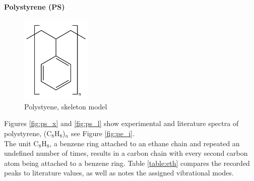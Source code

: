     \newpage

    \paragraph{Polystyrene (PS)}
    
    \begin{figure} %
        \centering
        \vspace{-20pt}
        \includegraphics[width=0.3\textwidth]{images/raman_spectra/ps_i.png}
        \caption{Polystyene, skeleton model}
        \label{fig:ps_i}
    \end{figure}


    Figures \ref{fig:ps_x} and \ref{fig:ps_l} show experimental and literature spectra of polystyrene, (C\(_8\)H\(_8\))\(_n\) see Figure \ref{fig:pe_i}.\\ 
    The unit C\(_8\)H\(_8\), a benzene ring attached to an ethane chain and repeated an undefined number of times, results in a carbon chain with every second carbon atom being attached to a benzene ring. Table \ref{table:eth} compares the recorded peaks to literature values, as well as notes the assigned vibrational modes. 

